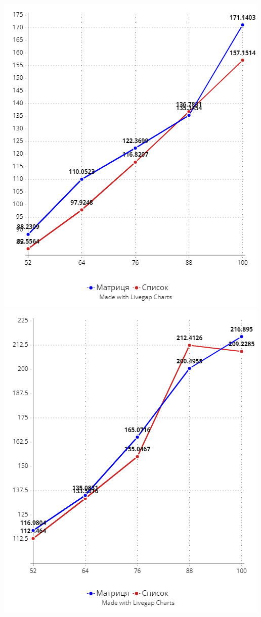 \documentclass[titlepage, a4paper]{article}
\begin{document}
\includegraphics[width=0.5\linewidth]{164-182.png}
\includegraphics[width=0.5\linewidth]{182-200.png}
\end{document}

